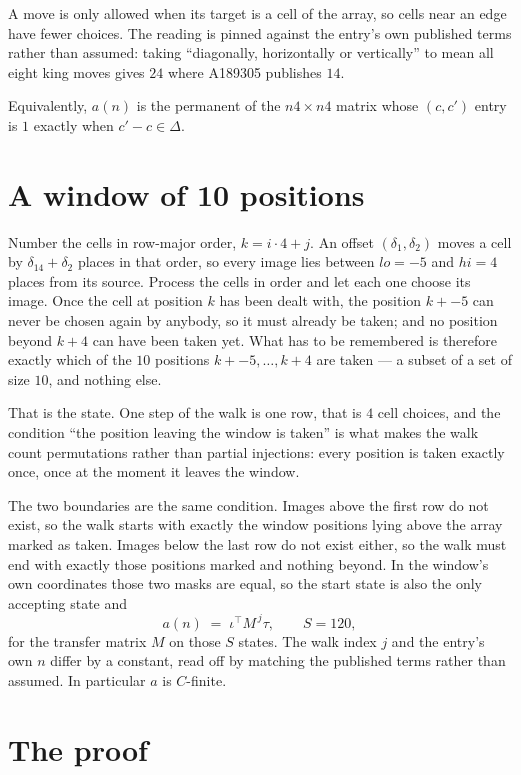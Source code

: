\documentclass[11pt,a4paper]{article}
\theoremstyle{plain}
\theoremstyle{definition}
\begin{document}
A move is only allowed when its target is a cell of the array, so cells near an
edge have fewer choices. The reading is pinned against the entry's own published terms rather
than assumed: taking ``diagonally, horizontally or vertically'' to mean all eight king moves
gives $24$ where A189305 publishes $14$.

Equivalently, $a(n)$ is the permanent of the $n4\times n4$ matrix whose $(c,c')$ entry is
$1$ exactly when $c'-c\in\Delta$.

\section{A window of 10 positions}

Number the cells in row-major order, $k=i\cdot4+j$. An offset $(\delta_1,\delta_2)$ moves a
cell by $\delta_14+\delta_2$ places in that order, so every image lies between $lo=-5$ and
$hi=4$ places from its source. Process the cells in order and let each one choose its image.
Once the cell at position $k$ has been dealt with, the position $k+-5$ can never be chosen
again by anybody, so it must already be taken; and no position beyond $k+4$ can have been
taken yet. What has to be remembered is therefore exactly which of the $10$ positions
$k+-5,\dots,k+4$ are taken --- a subset of a set of size $10$, and nothing else.

That is the state. One step of the walk is one row, that is $4$ cell choices, and the
condition ``the position leaving the window is taken'' is what makes the walk count permutations
rather than partial injections: every position is taken exactly once, once at the moment it
leaves the window.

The two boundaries are the same condition. Images above the first row do not exist, so the walk
starts with exactly the window positions lying above the array marked as taken. Images below the
last row do not exist either, so the walk must end with exactly those positions marked and
nothing beyond. In the window's own coordinates those two masks are equal, so the start state is
also the only accepting state and
\[
a(n)\;=\;\iota^{\!\top}M^{\,j}\tau ,\qquad S=120,
\]
for the transfer matrix $M$ on those $S$ states. The walk index $j$ and the entry's own $n$
differ by a constant, read off by matching the published terms rather than assumed. In
particular $a$ is $C$-finite.

\section{The proof}
\end{document}
